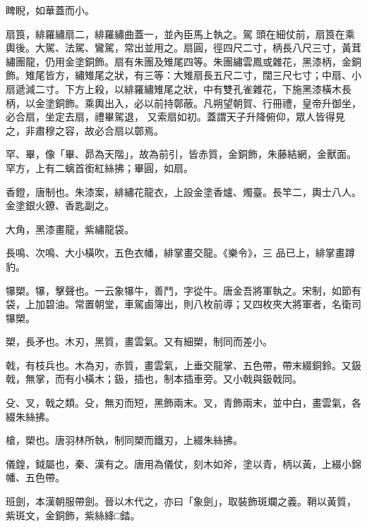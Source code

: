 \begin{pinyinscope}
 睥睨，如華蓋而小。



 扇筤，緋羅繡扇二，緋羅繡曲蓋一，並內臣馬上執之。駕
 頭在細仗前，扇筤在乘輿後。大駕、法駕、鸞駕，常出並用之。扇圓，徑四尺二寸，柄長八尺三寸，黃茸繡團龍，仍用金塗銅飾。扇有朱團及雉尾四等。朱團繡雲鳳或雜花，黑漆柄，金銅飾。雉尾皆方，繡雉尾之狀，有三等：大雉扇長五尺二寸，闊三尺七寸；中扇、小扇遞減二寸。下方上殺，以緋羅繡雉尾之狀，中有雙孔雀雜花，下施黑漆橫木長柄，以金塗銅飾。乘輿出入，必以前持鄣蔽。凡朔望朝賀、行冊禮，皇帝升御坐，必合扇，坐定去扇，禮畢駕退，
 又索扇如初。蓋謂天子升降俯仰，眾人皆得見之，非肅穆之容，故必合扇以鄣焉。



 罕、畢，像「畢、昴為天階」，故為前引，皆赤質，金銅飾，朱藤結網，金獸面。罕方，上有二螭首銜紅絲拂；畢圓，如扇。



 香鐙，唐制也。朱漆案，緋繡花龍衣，上設金塗香爐、燭臺。長竿二，輿士八人。金塗銀火鐐、香匙副之。



 大角，黑漆畫龍，紫繡龍袋。



 長鳴、次鳴、大小橫吹，五色衣幡，緋掌畫交龍。《樂令》，三
 品已上，緋掌畫蹲豹。



 犦槊。犦，擊聲也。一云象犦牛，善鬥，字從牛。唐金吾將軍執之。宋制，如節有袋，上加碧油。常置朝堂，車駕鹵簿出，則八枚前導；又四枚夾大將軍者，名衛司犦槊。



 槊，長矛也。木刃，黑質，畫雲氣。又有細槊，制同而差小。



 戟，有枝兵也。木為刃，赤質，畫雲氣，上垂交龍掌、五色帶，帶末綴銅鈴。又鈒戟，無掌，而有小橫木；鈒，插也，制本插車旁。又小戟與鈒戟同。



 殳、叉，戟之類。殳，無刃而短，黑飾兩末。叉，青飾兩末，並中白，畫雲氣，各綴朱絲拂。



 槍，槊也。唐羽林所執，制同槊而鐵刃，上綴朱絲拂。



 儀鍠，鉞屬也，秦、漢有之。唐用為儀仗，刻木如斧，塗以青，柄以黃，上綴小錦幡、五色帶。



 班劍，本漢朝服帶劍。晉以木代之，亦曰「象劍」，取裝飾斑斕之義。鞘以黃質，紫斑文，金銅飾，紫絲絳□錔。




\end{pinyinscope}
